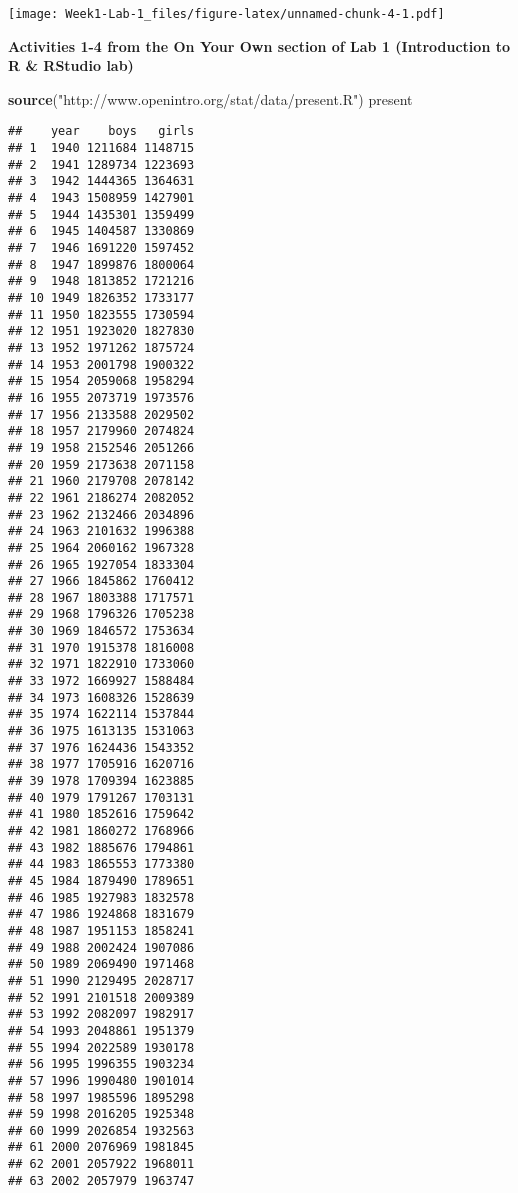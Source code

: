 \documentclass[]{article}
\newenvironment{Shaded}{\begin{snugshade}}{\end{snugshade}}
\newcommand{\DataTypeTok}[1]{\textcolor[rgb]{0.13,0.29,0.53}{#1}}
\newcommand{\KeywordTok}[1]{\textcolor[rgb]{0.13,0.29,0.53}{\textbf{#1}}}
\newcommand{\NormalTok}[1]{#1}
\newcommand{\OperatorTok}[1]{\textcolor[rgb]{0.81,0.36,0.00}{\textbf{#1}}}
\newcommand{\StringTok}[1]{\textcolor[rgb]{0.31,0.60,0.02}{#1}}
\begin{document}
\begin{Shaded}
\end{Shaded}

\texttt{[image: Week1-Lab-1\_files/figure-latex/unnamed-chunk-4-1.pdf]}

\textbf{Activities 1-4 from the On Your Own section of Lab 1
(Introduction to R \& RStudio lab)}

\begin{Shaded}
\begin{Highlighting}[]
\KeywordTok{source}\NormalTok{(}\StringTok{"http://www.openintro.org/stat/data/present.R"}\NormalTok{)}
\NormalTok{present}
\end{Highlighting}
\end{Shaded}

\begin{verbatim}
##    year    boys   girls
## 1  1940 1211684 1148715
## 2  1941 1289734 1223693
## 3  1942 1444365 1364631
## 4  1943 1508959 1427901
## 5  1944 1435301 1359499
## 6  1945 1404587 1330869
## 7  1946 1691220 1597452
## 8  1947 1899876 1800064
## 9  1948 1813852 1721216
## 10 1949 1826352 1733177
## 11 1950 1823555 1730594
## 12 1951 1923020 1827830
## 13 1952 1971262 1875724
## 14 1953 2001798 1900322
## 15 1954 2059068 1958294
## 16 1955 2073719 1973576
## 17 1956 2133588 2029502
## 18 1957 2179960 2074824
## 19 1958 2152546 2051266
## 20 1959 2173638 2071158
## 21 1960 2179708 2078142
## 22 1961 2186274 2082052
## 23 1962 2132466 2034896
## 24 1963 2101632 1996388
## 25 1964 2060162 1967328
## 26 1965 1927054 1833304
## 27 1966 1845862 1760412
## 28 1967 1803388 1717571
## 29 1968 1796326 1705238
## 30 1969 1846572 1753634
## 31 1970 1915378 1816008
## 32 1971 1822910 1733060
## 33 1972 1669927 1588484
## 34 1973 1608326 1528639
## 35 1974 1622114 1537844
## 36 1975 1613135 1531063
## 37 1976 1624436 1543352
## 38 1977 1705916 1620716
## 39 1978 1709394 1623885
## 40 1979 1791267 1703131
## 41 1980 1852616 1759642
## 42 1981 1860272 1768966
## 43 1982 1885676 1794861
## 44 1983 1865553 1773380
## 45 1984 1879490 1789651
## 46 1985 1927983 1832578
## 47 1986 1924868 1831679
## 48 1987 1951153 1858241
## 49 1988 2002424 1907086
## 50 1989 2069490 1971468
## 51 1990 2129495 2028717
## 52 1991 2101518 2009389
## 53 1992 2082097 1982917
## 54 1993 2048861 1951379
## 55 1994 2022589 1930178
## 56 1995 1996355 1903234
## 57 1996 1990480 1901014
## 58 1997 1985596 1895298
## 59 1998 2016205 1925348
## 60 1999 2026854 1932563
## 61 2000 2076969 1981845
## 62 2001 2057922 1968011
## 63 2002 2057979 1963747
\end{verbatim}
\end{document}
